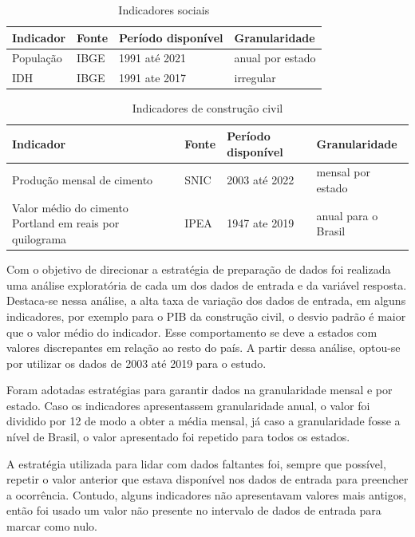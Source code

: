 \begin{table}[H]
    \centering
    \caption{Indicadores sociais}
    \begin{tabular}{llll}
        \toprule
        Indicador                   & Fonte & Período disponível & Granularidade         \\
        \midrule
        População                   & IBGE   & 1991 até 2021      & anual por estado      \\
        IDH                         & IBGE   & 1991 ate 2017      & irregular      \\
        \bottomrule
    \end{tabular}
\end{table}


\begin{table}[H]
    \centering
    \caption{Indicadores de construção civil}
    \begin{tabular}{llll}
        \toprule
        Indicador                   & Fonte & Período disponível & Granularidade         \\
        \midrule
        Produção mensal de cimento  & SNIC  & 2003 até 2022      & mensal por estado      \\
        Valor médio do cimento Portland em reais por quilograma   & IPEA   & 1947 ate 2019      & anual para o Brasil      \\
        \bottomrule
    \end{tabular}
\end{table}

Com o objetivo de direcionar a estratégia de preparação de dados
foi realizada uma análise exploratória de cada um dos dados de 
entrada e da variável resposta. Destaca-se nessa análise, a alta
taxa de variação dos dados de entrada, em alguns indicadores, por exemplo 
para o  PIB da construção civil, 
o desvio padrão é maior que o valor médio do indicador. Esse comportamento 
se deve a estados com valores discrepantes em relação ao resto do país.
A partir dessa análise, 
optou-se por utilizar os dados de 2003 até 2019 para o estudo.

Foram adotadas estratégias para garantir dados na granularidade
mensal e por estado. Caso os indicadores apresentassem granularidade anual, 
o valor foi dividido por 12 de modo a obter a média mensal, já caso a granularidade
fosse a nível de Brasil, o valor apresentado foi repetido para todos os 
estados.


A estratégia utilizada para lidar com dados faltantes foi, sempre que possível,
repetir o valor anterior que estava disponível nos dados de entrada para
preencher a ocorrência. Contudo, alguns indicadores não apresentavam 
valores mais antigos, então foi usado um valor não presente no intervalo
de dados de entrada para marcar como nulo.

